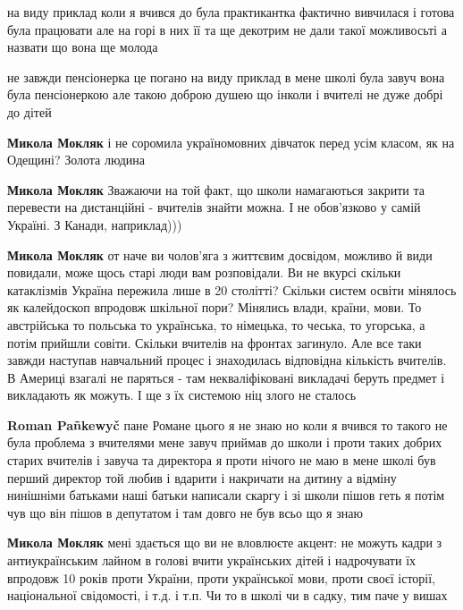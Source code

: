 \begin{itemize}
\begin{itemize}
на виду приклад коли я вчився до була практикантка фактично вивчилася і готова була працювати але на горі в них її та ще декотрим не дали такої можливосьті а назвати що вона ще молода

не завжди пенсіонерка це погано на виду приклад в мене школі була завуч вона була пенсіонеркою але такою доброю душею що інколи і вчителі не дуже добрі до дітей

\begin{itemize} %
\textbf{Микола Мокляк} і не соромила україномовних дівчаток перед усім класом, як на Одещині? Золота людина
\end{itemize} %

\textbf{Микола Мокляк} Зважаючи на той факт, що школи намагаються закрити та перевести на дистанційні - вчителів знайти можна. І не обов'язково у самій Україні. З Канади, наприклад)))

\textbf{Микола Мокляк} от наче ви чолов'яга з життєвим досвідом, можливо й види
повидали, може щось старі люди вам розповідали. Ви не вкурсі скільки
катаклізмів Україна пережила лише в 20 столітті? Скільки систем освіти мінялось
як калейдоскоп впродовж шкільної пори? Мінялись влади, країни, мови. То
австрійська то польська то українська, то німецька, то чеська, то угорська, а
потім прийшли совіти. Скільки вчителів на фронтах загинуло. Але все таки завжди
наступав навчальний процес і знаходилась відповідна кількість вчителів. В
Америці взагалі не паряться - там некваліфіковані викладачі беруть предмет і
викладають як можуть. І ще з їх системою ніц злого не сталось

\begin{itemize} %
\textbf{Roman Pañkewyč} пане Романе цього я не знаю но коли я вчився то такого не була проблема з вчителями мене завуч приймав до школи і проти таких добрих старих вчителів і завуча та директора я проти нічого не маю в мене школі був перший директор той любив і вдарити і накричати на дитину а відміну нинішніми батьками наші батьки написали скаргу і зі школи пішов геть я потім чув що він пішов в депутатом і там довго не був всьо що я знаю

\textbf{Микола Мокляк} мені здається що ви не вловлюєте акцент: не можуть кадри з антиукраїнським лайном в голові вчити українських дітей і надрочувати їх впродовж 10 років проти України, проти української мови, проти своєї історії, національної свідомості, і т.д. і т.п. Чи то в школі чи в садку, тим паче у вишах


\end{itemize}
\end{itemize}
\end{itemize}

